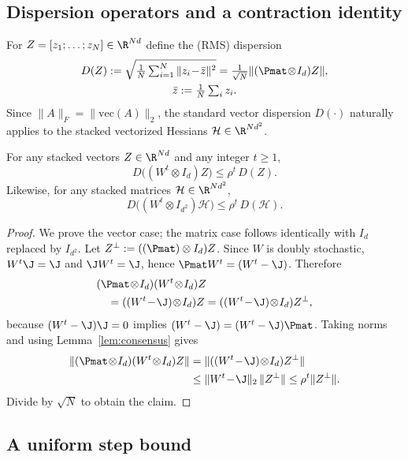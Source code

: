 \documentclass[review,onefignum,onetabnum]{siamart171218}
\begin{document}
\subsection{Dispersion operators and a contraction identity}

For $Z=[z_1;\dots;z_N]\in\R^{Nd}$ define the (RMS) dispersion
\begin{gather*}
D(Z):=\sqrt{\tfrac1N\textstyle\sum_{i=1}^N\|z_i\!-\!\bar z\|^2}
=\tfrac{1}{\sqrt N}\|(\Pmat\!\otimes\! I_d)Z\|,\\
\bar z:=\tfrac1N\textstyle\sum_i z_i.
\end{gather*}
Since $\|A\|_F = \|\mathrm{vec}(A)\|_2$, the standard vector dispersion $D(\cdot)$ naturally applies to the stacked vectorized Hessians $\mathcal{H} \in \R^{Nd^2}$.

\begin{lemma}\label{lem:mix_contract}
For any stacked vectors $Z\in\R^{Nd}$ and any integer $t\ge1$,
\[
D\big((W^t\otimes I_d)Z\big)\le \rho^t\,D(Z).
\]
Likewise, for any stacked matrices $\mathcal H\in\R^{Nd^2}$,
\[
D\big((W^t\otimes I_{d^2})\mathcal H\big)\le \rho^t\,D(\mathcal H).
\]
\end{lemma}
\begin{proof}
We prove the vector case; the matrix case follows identically with $I_d$ replaced by $I_{d^2}$.
Let $Z^\perp:=((\Pmat)\otimes I_d)Z$. Since $W$ is doubly stochastic, $W^t\J=\J$ and $\J W^t=\J$, hence
$\Pmat W^t=(W^t-\J)$. Therefore
\begin{align*}
&(\Pmat\!\otimes\! I_d)(W^t\!\otimes\! I_d)Z\\
&\quad=((W^t\!-\!\J)\!\otimes\! I_d)Z=((W^t\!-\!\J)\!\otimes\! I_d)Z^\perp,
\end{align*}
because $(W^t-\J)\J=0$ implies $(W^t-\J)=(W^t-\J)\Pmat$.
Taking norms and using Lemma~\ref{lem:consensus} gives
\begin{align*}
\|(\Pmat\!\otimes\! I_d)(W^t\!\otimes\! I_d)Z\|
&=\|((W^t\!-\!\J)\!\otimes\! I_d)Z^\perp\|\\
&\le \|W^t\!-\!\J\|_2\,\|Z^\perp\|
\le \rho^t\|Z^\perp\|.
\end{align*}
Divide by $\sqrt N$ to obtain the claim.
\end{proof}

\subsection{A uniform step bound}
\end{document}
